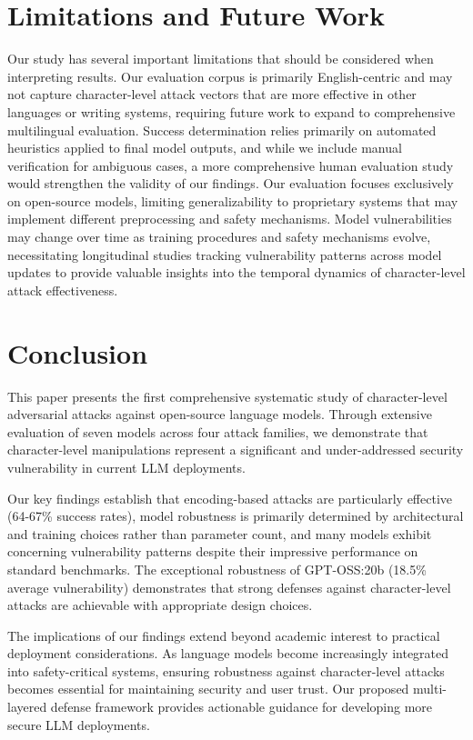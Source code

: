 \documentclass[11pt]{article}
\begin{document}
\begin{multicols}{2}
\section{Limitations and Future Work}

Our study has several important limitations that should be considered when interpreting results. Our evaluation corpus is primarily English-centric and may not capture character-level attack vectors that are more effective in other languages or writing systems, requiring future work to expand to comprehensive multilingual evaluation. Success determination relies primarily on automated heuristics applied to final model outputs, and while we include manual verification for ambiguous cases, a more comprehensive human evaluation study would strengthen the validity of our findings. Our evaluation focuses exclusively on open-source models, limiting generalizability to proprietary systems that may implement different preprocessing and safety mechanisms. Model vulnerabilities may change over time as training procedures and safety mechanisms evolve, necessitating longitudinal studies tracking vulnerability patterns across model updates to provide valuable insights into the temporal dynamics of character-level attack effectiveness.


\section{Conclusion}

This paper presents the first comprehensive systematic study of character-level adversarial attacks against open-source language models. Through extensive evaluation of seven models across four attack families, we demonstrate that character-level manipulations represent a significant and under-addressed security vulnerability in current LLM deployments.

Our key findings establish that encoding-based attacks are particularly effective (64-67\% success rates), model robustness is primarily determined by architectural and training choices rather than parameter count, and many models exhibit concerning vulnerability patterns despite their impressive performance on standard benchmarks. The exceptional robustness of GPT-OSS:20b (18.5\% average vulnerability) demonstrates that strong defenses against character-level attacks are achievable with appropriate design choices.

The implications of our findings extend beyond academic interest to practical deployment considerations. As language models become increasingly integrated into safety-critical systems, ensuring robustness against character-level attacks becomes essential for maintaining security and user trust. Our proposed multi-layered defense framework provides actionable guidance for developing more secure LLM deployments.


\end{multicols}
\end{document}
